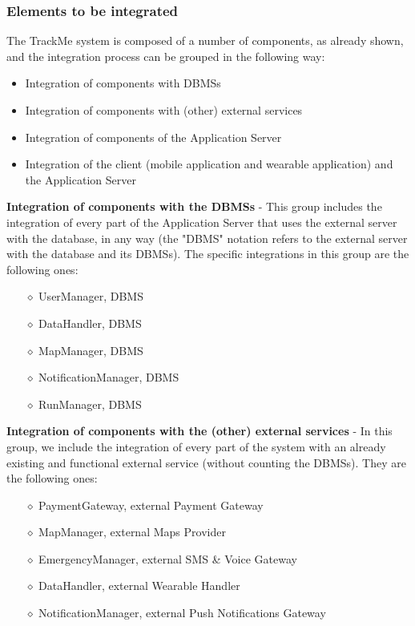 \subsubsection{Elements to be integrated}
The TrackMe system is composed of a number of components, as already shown, and the integration process can be grouped in the following way:
\begin{itemize}
\item Integration of components with DBMSs
\item Integration of components with (other) external services
\item Integration of components of the Application Server
\item Integration of the client (mobile application and wearable application) and the Application Server
\end{itemize}

\textbf{Integration of components with the DBMSs} - This group includes the integration of every part of the Application Server that uses the external server with the database, in any way (the "DBMS" notation refers to the external server with the database and its DBMSs). The specific integrations in this group are the following ones:
\begin{itemize}
\item[$\diamond$] UserManager, DBMS
\item[$\diamond$] DataHandler, DBMS
\item[$\diamond$] MapManager, DBMS
\item[$\diamond$] NotificationManager, DBMS
\item[$\diamond$] RunManager, DBMS
\end{itemize}

\textbf{Integration of components with the (other) external services} - In this group, we include the integration of every part of the system with an already existing and functional external service (without counting the DBMSs). They are the following ones:
\begin{itemize}
\item[$\diamond$] PaymentGateway, external Payment Gateway
\item[$\diamond$] MapManager, external Maps Provider
\item[$\diamond$] EmergencyManager, external SMS \& Voice Gateway
\item[$\diamond$] DataHandler, external Wearable Handler
\item[$\diamond$] NotificationManager, external Push Notifications Gateway
\end{itemize}

